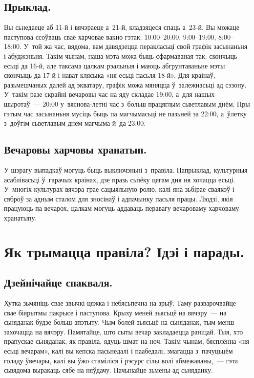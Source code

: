 \subsection{Прыклад.}
Вы сьнедаеце аб 11-й і вячэраеце а~21-й, кладзяцеся спаць а~23-й. Вы можаце паступова ссоўваць сваё харчовае вакно гэтак: 10:00–20:00, 9:00–19:00, 8:00–18:00. У~той жа час, вядома, вам давядзецца перакласьці свой графік засынаньня і абуджэньня.
Такім чынам, наша мэта можа быць сфармаваная так: скончыць есьці да 16-й, але таксама цалкам рэальныя і маюць абгрунтаваньне мэты скончыць да 17-й і нават клясыка «ня есьці пасьля 18-й». Для краінаў, разьмешчаных далей ад экватару, графік можа мяняцца ў~залежнасьці ад сэзону. У~такім разе скрайні вечаровы час на яду складае 19:00, а~для нашых шыротаў~--- 20:00 у~вяснова-летні час з~больш працяглым сьветлавым днём. Пры гэтым час засынаньня мусіць быць па магчымасьці не пазьней за 22:00, а~ўлетку з~доўгім сьветлавым днём магчыма й~да 23:00.

\subsection{Вечаровы харчовы хранатып.}
У шэрагу выпадкаў могуць быць выключэньні з~правіла. Напрыклад, культурныя асаблівасьці ў~гарачых краінах, дзе празь сьпёку цягам дня ня хочацца есьці. У~многіх культурах вячэра грае сацыяльную ролю, калі яна зьбірае сваякоў і сяброў за адным сталом для зносінаў і адпачынку пасьля працы. Людзі, якія працуюць па вечарох, цалкам могуць аддаваць перавагу вечароваму харчоваму хранатыпу.

\section{Як трымацца правіла? Ідэі і парады.}

\subsection{Дзейнічайце спакваля.}
Хутка зьмяніць свае звычкі цяжка і небясьпечна на зрыў. Таму разварочвайце свае біярытмы пакрысе і паступова. Крыху меней зьясьцё на вячэру~--- на сьняданак будзе больш апэтыту. Чым болей зьясьцё на сьняданак, тым менш захочацца на вячэру. Памятайце, што сыты вечар закладаецца раніцай. Тыя, хто прапускае сьняданак, як правіла, ядуць шмат на ноч. Такім чынам, бясплённа «ня есьці вечарам», калі вы кепска пасьнедалі і паабедалі; змагацца з~пачуцьцём голаду ўвечары, калі вы ўжо стаміліся і рэсурс сілы волі абмежаваны,~--- гэта сьвядома выракаць сябе на няўдачу. Пачынайце зьмены ад сьняданку.

